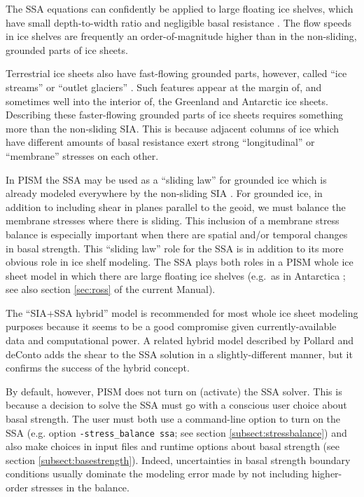 The SSA equations can confidently be applied to large floating ice shelves, which have small depth-to-width ratio and negligible basal resistance \cite{Morland,MorlandZainuddin}.  The flow speeds in ice shelves are frequently an order-of-magnitude higher than in the non-sliding, grounded parts of ice sheets.

Terrestrial ice sheets also have fast-flowing grounded parts, however, called ``ice streams'' or ``outlet glaciers'' \cite{TrufferEchelmeyer}.  Such features appear at the margin of, and sometimes well into the interior of, the Greenland \cite{Joughinetal2001} and Antarctic \cite{BamberVaughanJoughin} ice sheets.  Describing these faster-flowing grounded parts of ice sheets requires something more than the non-sliding SIA.  This is because adjacent columns of ice which have different amounts of basal resistance exert strong ``longitudinal'' or ``membrane'' stresses \cite{SchoofStream} on each other.

In PISM the SSA may be used as a ``sliding law'' for grounded ice which is already modeled everywhere by the non-sliding SIA \cite{BBssasliding,Winkelmannetal2011}.  For grounded ice, in addition to including shear in planes parallel to the geoid, we must balance the membrane stresses where there is sliding.  This inclusion of a membrane stress balance is especially important when there are spatial and/or temporal changes in basal strength.  This ``sliding law'' role for the SSA is in addition to its more obvious role in ice shelf modeling.  The SSA plays both roles in a PISM whole ice sheet model in which there are large floating ice shelves (e.g.~as in Antarctica \cite{Golledgeetal2012ant,Martinetal2011,Winkelmannetal2011}; see also section \ref{sec:ross} of the current Manual).

The ``SIA+SSA hybrid'' model is recommended for most whole ice sheet modeling purposes because it seems to be a good compromise given currently-available data and computational power.  A related hybrid model described by Pollard and deConto \cite{PollardDeConto} adds the shear to the SSA solution in a slightly-different manner, but it confirms the success of the hybrid concept.

By default, however, PISM does not turn on (activate) the SSA solver.  This is because a decision to solve the SSA must go with a conscious user choice about basal strength.  The user must both use a command-line option to turn on the SSA (e.g. option \texttt{-stress_balance ssa}; see section \ref{subsect:stressbalance}) and also make choices in input files and runtime options about basal strength (see section \ref{subsect:basestrength}).  Indeed, uncertainties in basal strength boundary conditions usually dominate the modeling error made by not including higher-order stresses in the balance.  

